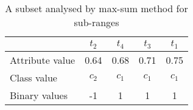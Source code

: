 \begin{table}[!htbp]
\caption{A subset analysed by max-sum method for sub-ranges}
\label{table:table2_4}
\centering
\begin{tabular}{lcccc}
	\toprule
	\textbf{} & \textbf{$\mathit{t_2}$}   & \textbf{$\mathit{t_4}$} & \textbf{$\mathit{t_3}$} & \textbf{$\mathit{t_1}$} \\
	\midrule
	Attribute value & 0.64 & 0.68 & 0.71 & 0.75 \\
	Class value & ${c_2}$ & ${c_1}$ & ${c_1}$ & ${c_1}$ \\
	Binary values & -1 & 1 & 1 & 1 \\
	\bottomrule
\end{tabular} 
\end{table}
